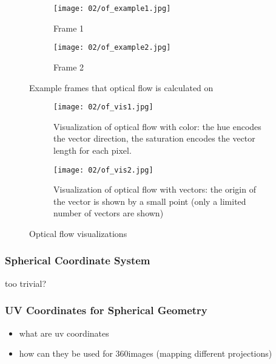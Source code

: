 \begin{figure}
\centering
    \begin{subfigure}[t]{0.5\textwidth}            
            \centering
            \texttt{[image: 02/of\_example1.jpg]}
            \caption{Frame 1}
    \end{subfigure}%
    \begin{subfigure}[t]{0.5\textwidth}
            \centering
            \texttt{[image: 02/of\_example2.jpg]}
            \caption{Frame 2}
    \end{subfigure}
    \caption[Optical flow example]{Example frames that optical flow is calculated on}\label{fig:of_example_bike}

    \quad
    \begin{subfigure}[t]{0.5\textwidth}            
            \centering
            \texttt{[image: 02/of\_vis1.jpg]}
            \caption{Visualization of optical flow with color: the hue encodes the vector direction, the saturation encodes the vector length for each pixel.}
    \end{subfigure}%
    \begin{subfigure}[t]{0.5\textwidth}
            \centering
            \texttt{[image: 02/of\_vis2.jpg]}
            \caption{Visualization of optical flow with vectors: the origin of the vector is shown by a small point (only a limited number of vectors are shown)}
    \end{subfigure}
    \caption[Optical flow visualizations]{Optical flow visualizations}\label{fig:of_vis}
\end{figure}

\subsubsection{Spherical Coordinate System}
too trivial?

\subsubsection{UV Coordinates for Spherical Geometry}
\begin{itemize}
  \item what are uv coordinates
  \item how can they be used for 360\degree images (mapping different projections)
\end{itemize}

